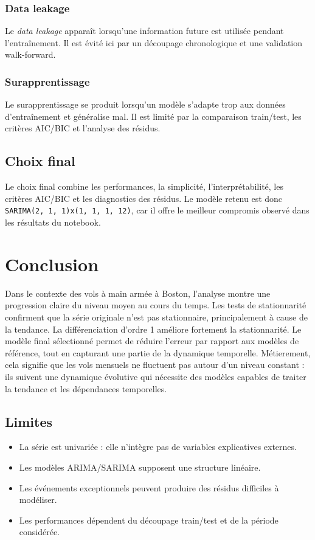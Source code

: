 \documentclass[12pt,a4paper]{report}
\begin{document}
\subsection{Data leakage}
Le \textit{data leakage} apparaît lorsqu'une information future est utilisée pendant l'entraînement. Il est évité ici par un découpage chronologique et une validation walk-forward.

\subsection{Surapprentissage}
Le surapprentissage se produit lorsqu'un modèle s'adapte trop aux données d'entraînement et généralise mal. Il est limité par la comparaison train/test, les critères AIC/BIC et l'analyse des résidus.

\section{Choix final}
Le choix final combine les performances, la simplicité, l'interprétabilité, les critères AIC/BIC et les diagnostics des résidus. Le modèle retenu est donc \texttt{SARIMA(2, 1, 1)x(1, 1, 1, 12)}, car il offre le meilleur compromis observé dans les résultats du notebook.

\chapter{Conclusion}
Dans le contexte des vols à main armée à Boston, l'analyse montre une progression claire du niveau moyen au cours du temps. Les tests de stationnarité confirment que la série originale n'est pas stationnaire, principalement à cause de la tendance. La différenciation d'ordre 1 améliore fortement la stationnarité. Le modèle final sélectionné permet de réduire l'erreur par rapport aux modèles de référence, tout en capturant une partie de la dynamique temporelle. Métierement, cela signifie que les vols mensuels ne fluctuent pas autour d'un niveau constant : ils suivent une dynamique évolutive qui nécessite des modèles capables de traiter la tendance et les dépendances temporelles.

\section{Limites}
\begin{itemize}
    \item La série est univariée : elle n'intègre pas de variables explicatives externes.
    \item Les modèles ARIMA/SARIMA supposent une structure linéaire.
    \item Les événements exceptionnels peuvent produire des résidus difficiles à modéliser.
    \item Les performances dépendent du découpage train/test et de la période considérée.
\end{itemize}
\end{document}
